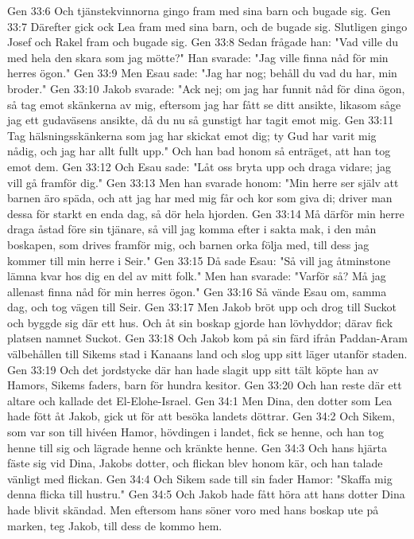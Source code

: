 Gen 33:6  Och tjänstekvinnorna gingo fram med sina barn och bugade sig.
Gen 33:7  Därefter gick ock Lea fram med sina barn, och de bugade sig. Slutligen gingo Josef och Rakel fram och bugade sig.
Gen 33:8  Sedan frågade han: "Vad ville du med hela den skara som jag mötte?" Han svarade: "Jag ville finna nåd för min herres ögon."
Gen 33:9  Men Esau sade: "Jag har nog; behåll du vad du har, min broder."
Gen 33:10  Jakob svarade: "Ack nej; om jag har funnit nåd för dina ögon, så tag emot skänkerna av mig, eftersom jag har fått se ditt ansikte, likasom såge jag ett gudaväsens ansikte, då du nu så gunstigt har tagit emot mig.
Gen 33:11  Tag hälsningsskänkerna som jag har skickat emot dig; ty Gud har varit mig nådig, och jag har allt fullt upp." Och han bad honom så enträget, att han tog emot dem.
Gen 33:12  Och Esau sade: "Låt oss bryta upp och draga vidare; jag vill gå framför dig."
Gen 33:13  Men han svarade honom: "Min herre ser själv att barnen äro späda, och att jag har med mig får och kor som giva di; driver man dessa för starkt en enda dag, så dör hela hjorden.
Gen 33:14  Må därför min herre draga åstad före sin tjänare, så vill jag komma efter i sakta mak, i den mån boskapen, som drives framför mig, och barnen orka följa med, till dess jag kommer till min herre i Seir."
Gen 33:15  Då sade Esau: "Så vill jag åtminstone lämna kvar hos dig en del av mitt folk." Men han svarade: "Varför så? Må jag allenast finna nåd för min herres ögon."
Gen 33:16  Så vände Esau om, samma dag, och tog vägen till Seir.
Gen 33:17  Men Jakob bröt upp och drog till Suckot och byggde sig där ett hus. Och åt sin boskap gjorde han lövhyddor; därav fick platsen namnet Suckot.
Gen 33:18  Och Jakob kom på sin färd ifrån Paddan-Aram välbehållen till Sikems stad i Kanaans land och slog upp sitt läger utanför staden.
Gen 33:19  Och det jordstycke där han hade slagit upp sitt tält köpte han av Hamors, Sikems faders, barn för hundra kesitor.
Gen 33:20  Och han reste där ett altare och kallade det El-Elohe-Israel.
Gen 34:1  Men Dina, den dotter som Lea hade fött åt Jakob, gick ut för att besöka landets döttrar.
Gen 34:2  Och Sikem, som var son till hivéen Hamor, hövdingen i landet, fick se henne, och han tog henne till sig och lägrade henne och kränkte henne.
Gen 34:3  Och hans hjärta fäste sig vid Dina, Jakobs dotter, och flickan blev honom kär, och han talade vänligt med flickan.
Gen 34:4  Och Sikem sade till sin fader Hamor: "Skaffa mig denna flicka till hustru."
Gen 34:5  Och Jakob hade fått höra att hans dotter Dina hade blivit skändad. Men eftersom hans söner voro med hans boskap ute på marken, teg Jakob, till dess de kommo hem.
